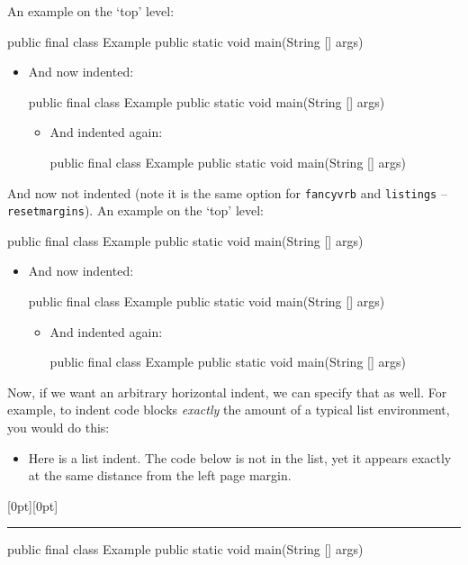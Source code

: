 \documentclass[polish]{article}
\begin{document}
\noindent%
An example on the `top' level:

\begin{javablock}
public final class Example {
	public static void main(String [] args) {
	}
}
\end{javablock}

\begin{itemize}
	\item And now indented:
\begin{javablock}
public final class Example {
	public static void main(String [] args) {
	}
}
\end{javablock}

	\begin{itemize}
		\item And indented again:
\begin{javablock}
public final class Example {
	public static void main(String [] args) {
	}
}
\end{javablock}
	\end{itemize}
\end{itemize}

\bigskip\noindent%
And now not indented (note it is the same option for \texttt{fancyvrb} and \texttt{listings} -- \texttt{resetmargins}).
An example on the `top' level:

\begin{ljavablock}
public final class Example {
	public static void main(String [] args) {
	}
}
\end{ljavablock}

\begin{itemize}
	\item And now indented:
\begin{ljavablock}
public final class Example {
	public static void main(String [] args) {
	}
}
\end{ljavablock}

	\begin{itemize}
		\item And indented again:
\begin{ljavablock}
public final class Example {
	public static void main(String [] args) {
	}
}
\end{ljavablock}
	\end{itemize}
\end{itemize}

\pagebreak
\bigskip\noindent%
Now, if we want an arbitrary horizontal indent, we can specify that as well. For example, to
indent code blocks \emph{exactly} the amount of a typical list environment, you would do this:

\begin{itemize}
	\item Here is a list indent. The code below is not in the list, yet it appears
	exactly at the same distance from the left page margin.
\end{itemize}

\noindent\hspace{\leftmargin}\raisebox{0pt}[0pt][0pt]{\rule{0.5pt}{50pt}}

\begin{mjavablock}
public final class Example {
	public static void main(String [] args) {
	}
}
\end{mjavablock}
\end{document}
